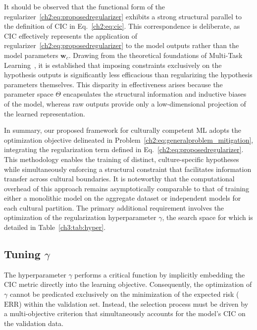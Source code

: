 It should be observed that the functional form of the regularizer~\eqref{ch2:eq:proposedregularizer} exhibits a strong structural parallel to the definition of CIC in Eq.~\eqref{ch2:eq:cic}. This correspondence is deliberate, as CIC effectively represents the application of regularizer~\eqref{ch2:eq:proposedregularizer} to the model outputs rather than the model parameters $\boldsymbol{w}_{c}$.
Drawing from the theoretical foundations of Multi-Task Learning~\citep{zhang2018overview}, it is established that imposing constraints exclusively on the hypothesis outputs is significantly less efficacious than regularizing the hypothesis parameters themselves. 
This disparity in effectiveness arises because the parameter space $\Theta$ encapsulates the structural information and inductive biases of the model, whereas raw outputs provide only a low-dimensional projection of the learned representation.

In summary, our proposed framework for culturally competent ML adopts the optimization objective delineated in Problem~\eqref{ch2:eq:generalproblem_mitigation}, integrating the regularization term defined in Eq.~\eqref{ch2:eq:proposedregularizer}. 
This methodology enables the training of distinct, culture-specific hypotheses while simultaneously enforcing a structural constraint that facilitates information transfer across cultural boundaries.
It is noteworthy that the computational overhead of this approach remains asymptotically comparable to that of training either a monolithic model on the aggregate dataset or independent models for each cultural partition. 
The primary additional requirement involves the optimization of the regularization hyperparameter $\gamma$, the search space for which is detailed in Table~\ref{ch3:tab:hyper}.
%
\subsection{Tuning \texorpdfstring{$\gamma$}{gamma}}
\label{ch2:sec:tuning_gamma}
%
The hyperparameter $\gamma$ performs a critical function by implicitly embedding the CIC metric directly into the learning objective. 
Consequently, the optimization of $\gamma$ cannot be predicated exclusively on the minimization of the expected risk ($\text{ERR}$) within the validation set. 
Instead, the selection process must be driven by a multi-objective criterion that simultaneously accounts for the model's $\text{CIC}$ on the validation data.

